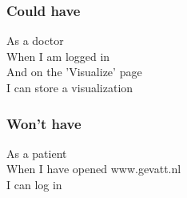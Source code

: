 	\subsubsection*{Could have}
		As a doctor\\
		When I am logged in\\
		And on the 'Visualize' page\\
		I can store a visualization\\
		
	\subsubsection*{Won't have}
		As a patient\\
		When I have opened www.gevatt.nl\\
		I can log in\\